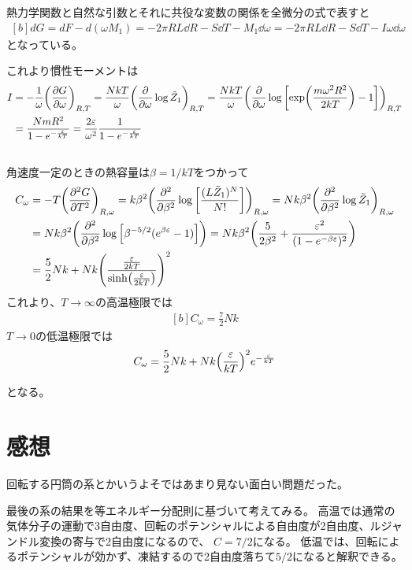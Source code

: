 \documentclass[../ap_2023.tex]{subfiles}
\begin{document}
熱力学関数と自然な引数とそれに共役な変数の関係を全微分の式で表すと
\begin{equation}\begin{aligned}[b]
    dG = dF-d(\omega M_1)= -2\pi RL \dd{R} -S\dd{T}-M_1\dd{\omega} = -2\pi RL \dd{R} -S\dd{T}-I\omega\dd{\omega}
\end{aligned}\end{equation}
となっている。

これより慣性モーメントは
\begin{equation}\begin{aligned}[b]
    I &= -\frac{1}{\omega}\qty(\pdv{G}{\omega})_{R,T}
        = \frac{NkT}{\omega}\qty(\pdv{\omega}\log\tilde{Z}_1)_{R,T}
        = \frac{NkT}{\omega}\qty(\pdv{\omega}\log\qty[\exp(\frac{m\omega^2R^2}{2kT})-1])_{R,T}\\
    &= \frac{NmR^2}{1-e^{-\frac{\varepsilon}{kT}}} = \frac{2\varepsilon}{\omega ^2}\frac{1}{1-e^{-\frac{\varepsilon}{kT}}}
\end{aligned}\end{equation}

\subsection{}
角速度一定のときの熱容量は\(\beta=1/kT\)をつかって
\begin{equation}\begin{aligned}[b]
    C_\omega &= -T\qty(\pdv[2]{G}{T})_{R,\omega}
        = k\beta^2\qty(\pdv[2]{\beta}\log\qty[\frac{(L\tilde{Z}_1)^N}{N!}])_{R,\omega}
        = Nk\beta^2\qty(\pdv[2]{\beta}\log \tilde{Z}_1)_{R,\omega}\\
    &= Nk\beta^2\qty(\pdv[2]{\beta}\log\qty[\beta^{-5/2}(e^{\beta\varepsilon}-1)])
        =Nk\beta^2\qty(\frac{5}{2\beta^2}+\frac{\varepsilon^2}{(1-e^{-\beta \varepsilon})^2})\\
    &= \frac{5}{2}Nk + Nk\qty(\frac{\frac{\varepsilon}{2kT}}{\sinh(\frac{\varepsilon}{2kT})})^2
\end{aligned}\end{equation}
これより、\(T\to\infty\)の高温極限では
\begin{equation}\begin{aligned}[b]
    C_\omega = \frac{7}{2}Nk
\end{aligned}\end{equation}
\(T\to 0\)の低温極限では
\begin{equation}\begin{aligned}[b]
    C_\omega = \frac{5}{2}Nk +Nk\qty(\frac{\varepsilon}{kT})^2e^{-\frac{\varepsilon}{kT}}
\end{aligned}\end{equation}

となる。

\section*{感想}
回転する円筒の系とかいうよそではあまり見ない面白い問題だった。

最後の系の結果を等エネルギー分配則に基づいて考えてみる。
高温では通常の気体分子の運動で3自由度、回転のポテンシャルによる自由度が2自由度、ルジャンドル変換の寄与で2自由度になるので、
\(C=7/2\)になる。
低温では、回転によるポテンシャルが効かず、凍結するので2自由度落ちて\(5/2\)になると解釈できる。
\end{document}
